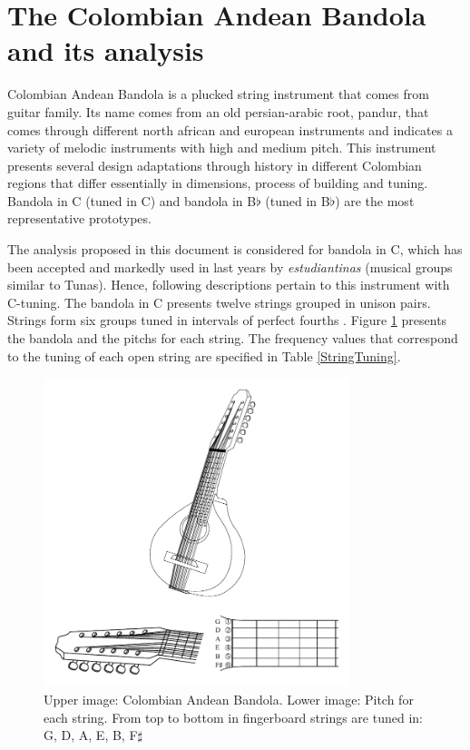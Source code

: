 \section{The Colombian Andean Bandola and its analysis}

Colombian Andean Bandola is a plucked string instrument that comes from guitar family. Its name comes from an old persian-arabic root, pandur, that comes through different north african and european instruments and indicates a variety of melodic instruments with high and medium pitch. This instrument presents several design adaptations through history in different Colombian regions that differ essentially in dimensions, process of building and tuning. Bandola in C (tuned in C) and bandola in B$\flat$ (tuned in B$\flat$) are the most representative prototypes.

The analysis proposed in this document is considered for bandola in C, which has been accepted and markedly used in last years by \textit{estudiantinas} (musical groups similar to Tunas). Hence, following descriptions pertain to this instrument with C-tuning. The bandola in C presents twelve strings grouped in unison pairs. Strings form six groups tuned in intervals of perfect fourths \cite{thesis:bandola}. Figure \ref{Bandola} presents the bandola and the pitchs for each string. The frequency values that correspond to the tuning of each open string are specified in Table \ref{StringTuning}.

\begin{figure}[h]
\centering
\includegraphics[height=9cm]{img/bandola.pdf}
\caption[Description of a Colombian Andean Bandola]{Upper image: Colombian Andean Bandola. Lower image: Pitch for each string. From top to bottom in fingerboard strings are tuned in: G, D, A, E, B, F$\sharp$}
\label{Bandola}
\end{figure}

